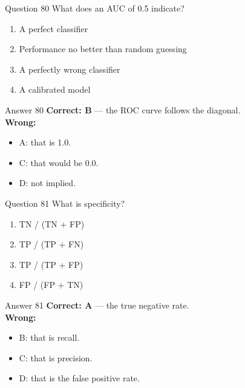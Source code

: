 \documentclass[aspectratio=169,11pt]{beamer}
\begin{document}
\begin{frame}{Question 80}
What does an AUC of 0.5 indicate?
\begin{enumerate}[label=\Alph*.]
\item A perfect classifier
\item Performance no better than random guessing
\item A perfectly wrong classifier
\item A calibrated model
\end{enumerate}
\end{frame}
\begin{frame}{Answer 80}
\textbf{Correct: B} --- the ROC curve follows the diagonal.\\
\vspace{0.5em}
\textbf{Wrong:}
\begin{itemize}
\item A: that is 1.0.
\item C: that would be 0.0.
\item D: not implied.
\end{itemize}
\end{frame}

\begin{frame}{Question 81}
What is specificity?
\begin{enumerate}[label=\Alph*.]
\item TN / (TN + FP)
\item TP / (TP + FN)
\item TP / (TP + FP)
\item FP / (FP + TN)
\end{enumerate}
\end{frame}
\begin{frame}{Answer 81}
\textbf{Correct: A} --- the true negative rate.\\
\vspace{0.5em}
\textbf{Wrong:}
\begin{itemize}
\item B: that is recall.
\item C: that is precision.
\item D: that is the false positive rate.
\end{itemize}
\end{frame}
\end{document}
